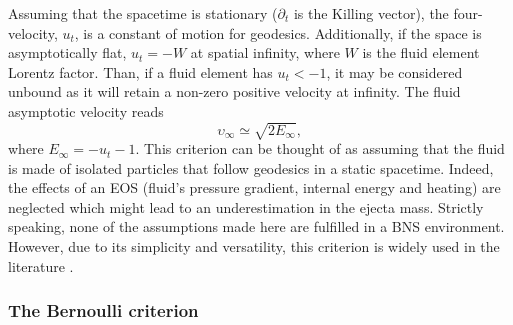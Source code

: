 Assuming that the spacetime is stationary ($\partial_t$ is the Killing vector), %
the four-velocity, $u_t$, is a constant of motion for geodesics. 
%
Additionally, if the space is asymptotically flat, 
$u_t = -W$ at spatial infinity, where $W$ is the fluid element Lorentz factor. 
Than, if a fluid element has $u_t < -1$, it may be considered unbound 
as it will retain a non-zero positive velocity at infinity. 
%
The fluid asymptotic velocity reads 
\begin{equation}
\upsilon_{\infty} \simeq \sqrt{2E_{\infty}}, %
\end{equation}
%
where $E_{\infty} = -u_t - 1$.
%
This criterion can be thought of as assuming that the fluid 
is made of isolated particles that follow geodesics in
a static spacetime. Indeed, the effects of an \ac{EOS} 
(fluid's pressure gradient, internal energy and heating) %
are neglected which might lead to an 
underestimation in the ejecta mass. 
%
%
Strictly speaking, none of the assumptions made here are 
fulfilled in a \ac{BNS} \pmerg{} environment. However, due to its 
simplicity and versatility, this criterion 
is widely used in the literature 
\citep[\eg][]{Radice:2018pdn,Vincent:2019kor}.



\subsubsection{The Bernoulli criterion}

